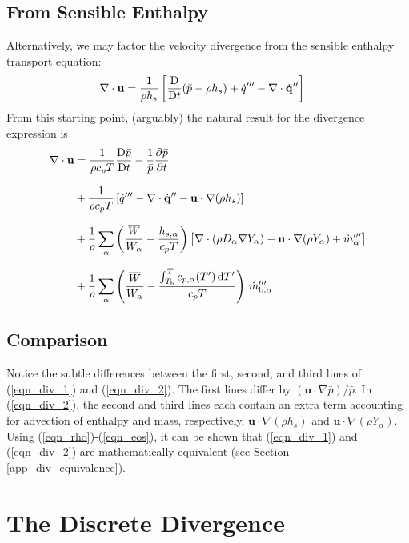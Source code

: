 \subsection{From Sensible Enthalpy}
Alternatively, we may factor the velocity divergence from the sensible enthalpy transport equation:
\begin{align}
\label{eqn_div_new}
\nabla\cdot\mathbf{u} &= \frac{1}{\rho h_s} \left[ \frac{\mbox{D}}{\mbox{D} t}(\bar{p}-\rho h_s) + \dot{q}^{\prime\prime\prime} - \nabla\cdot \dot{\mathbf{q}}^{\prime\prime} \right]
\end{align}
From this starting point, (arguably) the natural result for the divergence expression is
\begin{align}
\label{eqn_div_2}
\nabla\cdot\mathbf{u} &= \frac{1}{\rho c_p T}\frac{\mbox{D} \bar{p}}{\mbox{D} t} - \frac{1}{\bar{p}} \frac{\partial \bar{p}}{\partial t} \notag\\[.1in]
&+ \frac{1}{\rho c_p T}\left[ \dot{q}^{\prime\prime\prime} - \nabla\cdot \dot{\mathbf{q}}^{\prime\prime} - \mathbf{u} \cdot\nabla (\rho h_s) \right] \notag\\[.1in]
&+ \frac{1}{\rho} \sum_\alpha \left(\frac{\overline{W}}{W_\alpha} - \frac{h_{s,\alpha}}{c_p T} \right) \big[ \nabla\cdot (\rho D_\alpha \nabla Y_\alpha) - \mathbf{u} \cdot \nabla (\rho Y_\alpha) + \dot{m}_\alpha^{\prime\prime\prime} \big] \notag \\[.1in]
&+ \frac{1}{\rho} \sum_\alpha \left(\frac{\overline{W}}{W_\alpha} - \frac{\int_{T_{\rm b}}^T c_{p,\alpha}(T') \, {\rm d}T'}{c_p T} \right) \, \dot{m}_{\rm b,\alpha}^{\prime\prime\prime}
\end{align}

\subsection{Comparison}
Notice the subtle differences between the first, second, and third lines of (\ref{eqn_div_1}) and (\ref{eqn_div_2}).  The first lines differ by $\displaystyle (\mathbf{u}\cdot\nabla \bar{p})/\bar{p}$. In (\ref{eqn_div_2}), the second and third lines each contain an extra term accounting for advection of enthalpy and mass, respectively, $\mathbf{u} \cdot\nabla (\rho h_s)$ and $\mathbf{u} \cdot \nabla (\rho Y_\alpha)$.  Using (\ref{eqn_rho})-(\ref{eqn_eos}), it can be shown that (\ref{eqn_div_1}) and (\ref{eqn_div_2}) are mathematically equivalent (see Section \ref{app_div_equivalence}).


\section{The Discrete Divergence}
\label{discrete_divergence}

